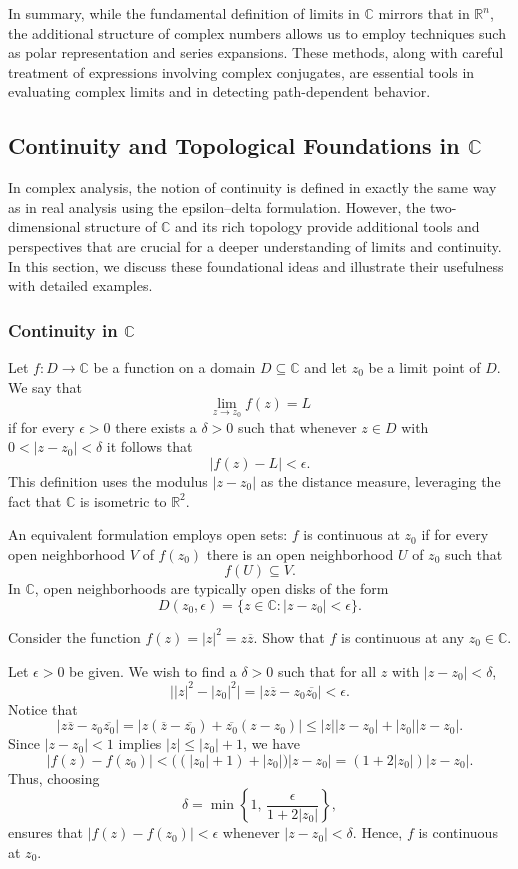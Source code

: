 \noindent In summary, while the fundamental definition of limits in \(\mathbb{C}\) mirrors that in \(\mathbb{R}^n\), the additional structure of complex numbers allows us to employ techniques such as polar representation and series expansions. These methods, along with careful treatment of expressions involving complex conjugates, are essential tools in evaluating complex limits and in detecting path-dependent behavior.


\subsection*{Continuity and Topological Foundations in \(\mathbb{C}\)}

\noindent In complex analysis, the notion of continuity is defined in exactly the same way as in real analysis using the epsilon–delta formulation. However, the two-dimensional structure of \(\mathbb{C}\) and its rich topology provide additional tools and perspectives that are crucial for a deeper understanding of limits and continuity. In this section, we discuss these foundational ideas and illustrate their usefulness with detailed examples.

\subsubsection*{Continuity in \(\mathbb{C}\)}

\noindent Let \(f: D \to \mathbb{C}\) be a function on a domain \(D \subseteq \mathbb{C}\) and let \(z_0\) be a limit point of \(D\). We say that 
\[
\lim_{z \to z_0} f(z) = L
\]
if for every \(\epsilon > 0\) there exists a \(\delta > 0\) such that whenever \(z \in D\) with \(0 < |z-z_0| < \delta\) it follows that
\[
|f(z) - L| < \epsilon.
\]
This definition uses the modulus \(|z-z_0|\) as the distance measure, leveraging the fact that \(\mathbb{C}\) is isometric to \(\mathbb{R}^2\).

An equivalent formulation employs open sets: \(f\) is continuous at \(z_0\) if for every open neighborhood \(V\) of \(f(z_0)\) there is an open neighborhood \(U\) of \(z_0\) such that
\[
f(U) \subseteq V.
\]
In \(\mathbb{C}\), open neighborhoods are typically open disks of the form
\[
D(z_0, \epsilon) = \{ z \in \mathbb{C} : |z-z_0| < \epsilon \}.
\]
\exampleline
\begin{example}
Consider the function \(f(z) = |z|^2 = z\overline{z}\). Show that \(f\) is continuous at any \(z_0 \in \mathbb{C}\).
\begin{solution}
Let \(\epsilon > 0\) be given. We wish to find a \(\delta > 0\) such that for all \(z\) with \(|z-z_0| < \delta\),
\[
\bigl||z|^2 - |z_0|^2\bigr| = |z\overline{z} - z_0\overline{z_0}| < \epsilon.
\]
Notice that
\[
|z\overline{z} - z_0\overline{z_0}| = |z(\overline{z}-\overline{z_0}) + \overline{z_0}(z-z_0)| \leq |z||z-z_0| + |z_0||z-z_0|.
\]
Since \(|z-z_0|<1\) implies \(|z| \le |z_0| + 1\), we have
\[
|f(z) - f(z_0)| < \bigl((|z_0|+1) + |z_0|\bigr)|z-z_0| = (1+2|z_0|)|z-z_0|.
\]
Thus, choosing
\[
\delta = \min\left\{1,\,\frac{\epsilon}{1+2|z_0|}\right\},
\]
ensures that \(|f(z)-f(z_0)| < \epsilon\) whenever \(|z-z_0| < \delta\). Hence, \(f\) is continuous at \(z_0\).
\end{solution}
\end{example}
\exampleline
